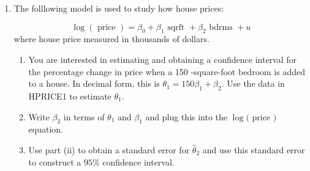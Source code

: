 \documentclass[12pt]{article}
\begin{document}
\begin{enumerate}
{\begin{enumerate}
The interpretation of "offset" here means that the effect of increasing expenditures for one candidate is exactly countered by increasing expenditures for the other candidate. Mathematically, this means:
\[
\beta_1 + \beta_2 = 0.
\]
The null hypothesis is:
\[
H_0: \beta_1 + \beta_2 = 0.
\]
The alternative hypothesis is:
\[
H_a: \beta_1 + \beta_2 \neq 0.
\]

This hypothesis implies that if both candidates increase their expenditures by 1\%, the net effect on Candidate A’s vote share would be zero.

\item 
\begin{verbatim}
# install.packages("wooldridge")
# install.packages("car")

################################################
library(car)
library(dplyr)
data(vote1, package='wooldridge')

# Estimating the model
model1 <- lm(voteA ~ lexpendA + lexpendB + prtystrA, data = vote1)
summary(model1)

# Test the hypothesis that beta1 + beta2 = 0
linearHypothesis(model1, "lexpendA + lexpendB = 0")

# Create a new variable that is the sum of lexpendA and lexpendB
vote1 <- vote1 %>% mutate(sum_expend = lexpendA + lexpendB)

# Estimate the model
model2 <- lm(voteA ~ sum_expend + prtystrA, data = vote1)

# Summary of the model
summary(model2)
\end{verbatim}

\end{enumerate}

}



\item The folllowing model is used to study how house prices:

$$
\log (\text { price })=\beta_0+\beta_1 \text { sqrft }+\beta_2 \text { bdrms }+u
$$
where house price measured in thousands of dollars.
\begin{enumerate}
    \item You are interested in estimating and obtaining a confidence interval for the percentage change in price when a 150 -square-foot bedroom is added to a house. In decimal form, this is $\theta_1=150 \beta_1+\beta_2$. Use the data in HPRICE1 to estimate $\theta_1$.
\item Write $\beta_2$ in terms of $\theta_1$ and $\beta_1$ and plug this into the $\log ($ price $)$ equation.
\item  Use part (ii) to obtain a standard error for $\hat{\theta}_2$ and use this standard error to construct a $95 \%$ confidence interval.
\end{enumerate}




\end{enumerate}
\end{document}
